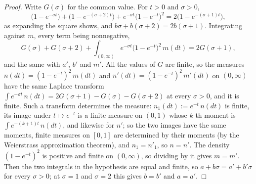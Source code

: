 \begin{proof}
\leanok
Write $G(\sigma)$ for the common value. For $t > 0$ and $\sigma > 0$,
\[
  \bigl(1 - e^{-\sigma t}\bigr) + \bigl(1 - e^{-(\sigma+2)t}\bigr)
  + e^{-\sigma t}\bigl(1 - e^{-t}\bigr)^2 = 2\bigl(1 - e^{-(\sigma+1)t}\bigr),
\]
as expanding the square shows, and $b\sigma + b(\sigma + 2) = 2b(\sigma + 1)$. Integrating against
$m$, every term being nonnegative,
\[
  G(\sigma) + G(\sigma + 2) + \int_{(0,\infty)} e^{-\sigma t}\bigl(1 - e^{-t}\bigr)^2\,m(dt)
  = 2G(\sigma + 1),
\]
and the same with $a'$, $b'$ and $m'$. All the values of $G$ are finite, so the measures
$n(dt) = (1 - e^{-t})^2\,m(dt)$ and $n'(dt) = (1 - e^{-t})^2\,m'(dt)$ on $(0,\infty)$ have the same
Laplace transform $\int e^{-\sigma t}\,n(dt) = 2G(\sigma+1) - G(\sigma) - G(\sigma+2)$ at every
$\sigma > 0$, and it is finite. Such a transform determines the measure: $n_1(dt) := e^{-t}\,n(dt)$
is finite, its image under $t \mapsto e^{-t}$ is a finite measure on $(0,1)$ whose $k$-th moment is
$\int e^{-(k+1)t}\,n(dt)$, and likewise for $n'$; so the two images have the same moments, finite
measures on $[0,1]$ are determined by their moments (by the Weierstrass approximation theorem), and
$n_1 = n'_1$, so $n = n'$. The density $(1 - e^{-t})^2$ is positive and finite on
$(0,\infty)$, so dividing by it gives $m = m'$. Then the two integrals in the hypothesis are equal
and finite, so $a + b\sigma = a' + b'\sigma$ for every $\sigma > 0$; at $\sigma = 1$ and $\sigma = 2$
this gives $b = b'$ and $a = a'$.
\end{proof}

